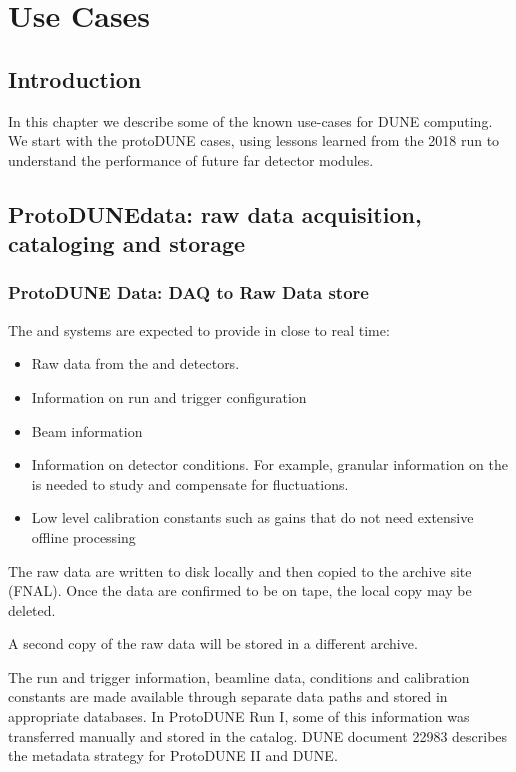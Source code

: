 \documentclass[../main-00.tex]{subfiles}
\begin{document}
\chapter{Use Cases}
\label{ch:use}
\section{Introduction}

In this chapter we describe some of the known use-cases for DUNE computing.  We start with the protoDUNE cases, using lessons learned from the 2018 run to understand the performance of future far detector modules. 




\section{ProtoDUNEdata: raw data acquisition, cataloging and storage}\label{sec:use:pdii-daq}



\subsection{ProtoDUNE Data: DAQ to Raw Data store}
The  and  systems are expected to provide in close to real time:

\begin{itemize}
    \item Raw data from the  and  detectors. 
    \item Information on run and trigger configuration
    \item Beam information
    \item Information on detector conditions. For example, granular information on the  is needed to study and compensate for  fluctuations. 
    \item Low level calibration constants such as gains that do not need extensive offline processing
    
\end{itemize}


The raw data are written to disk locally and then copied to the archive site (FNAL). Once the data are confirmed to be on tape, the local copy may be deleted.

A second copy of the raw data will be stored in a different archive. 

The run and trigger information, beamline  data, conditions and calibration constants are made available through separate data paths and stored in appropriate databases. In ProtoDUNE Run I, some of this information was transferred manually and stored in the  catalog.  DUNE document 22983 \cite{bib:docdb22983} describes the metadata strategy for ProtoDUNE II and DUNE. 
\end{document}

